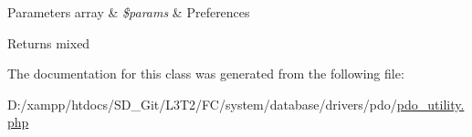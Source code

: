 \begin{DoxyParams}[1]{Parameters}
array & {\em \$params} & Preferences \\
\hline
\end{DoxyParams}
\begin{DoxyReturn}{Returns}
mixed 
\end{DoxyReturn}


The documentation for this class was generated from the following file\+:\begin{DoxyCompactItemize}
\item 
D\+:/xampp/htdocs/\+S\+D\+\_\+\+Git/\+L3\+T2/\+F\+C/system/database/drivers/pdo/\hyperlink{pdo__utility_8php}{pdo\+\_\+utility.\+php}\end{DoxyCompactItemize}
